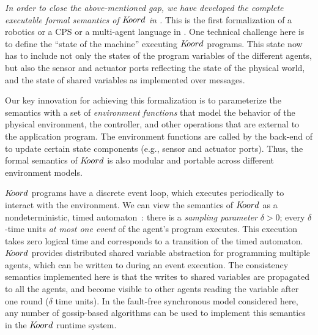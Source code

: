 {\em In order to close the above-mentioned gap, we have developed the complete executable formal semantics of $K\kern-2pt oord$ in \K.} This is the first formalization of a robotics or a CPS or a multi-agent language in \K. One  technical challenge here is to define the ``state of the machine'' executing $K\kern-2pt oord$ programs. This state now has to include not only the states of the program variables of the different agents, but also the sensor and actuator ports reflecting the state of the physical world, and the state of shared variables as implemented over messages.

Our key innovation for achieving this formalization is to parameterize the semantics with a set of {\em environment functions\/} that model the behavior of the physical environment, the controller, and other operations that are external to the application program.  The environment functions are called by the  back-end of \K to update certain state components (e.g., sensor and actuator ports). Thus, the formal semantics of $K\kern-2pt oord$ is also modular and portable across  different environment models. 


$K\kern-2pt oord$ programs have a discrete event loop, which executes periodically to interact with the environment. We can view the semantics of  $K\kern-2pt oord$ as a nondeterministic, timed automaton~\cite{TIOAmon}: there is a {\em sampling parameter\/} $\delta > 0$; every $\delta$-time units {\em at most one event} of the agent's program executes. This execution takes zero logical time and corresponds to a transition of the timed automaton. $K\kern-2pt oord$ provides distributed shared variable abstraction for programming multiple agents, which can be written to during an event execution. The consistency semantics implemented here is that the writes to shared variables are propagated to all the agents, and become visible to other agents reading the variable after one round ($\delta$ time units). In the fault-free synchronous model considered here, any number of gossip-based algorithms can be used to implement this semantics in the $K\kern-2pt oord$ runtime system. 


